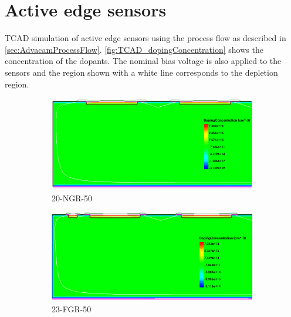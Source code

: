 \chapter{Active edge sensors}
\label{sec:appendixActiveEdge}

TCAD simulation of active edge sensors using the process flow as
described in
\cref{sec:AdvacamProcessFlow}. \cref{fig:TCAD_dopingConcentration}
shows the concentration of the dopants. The nominal bias voltage is
also applied to the sensors and the region shown with a white line
corresponds to the depletion region.

\begin{figure}[htbp]
  \centering
  \begin{subfigure}[b]{0.5\linewidth}
    \includegraphics[width=\textwidth]{figures/TCAD/dopingConcentration_NoGR.png}
    \caption{20-NGR-50}
  \end{subfigure}\hfill
  \begin{subfigure}[b]{0.5\linewidth}
    \includegraphics[width=\textwidth]{figures/TCAD/dopingConcentration_FloatGR.png}
    \caption{23-FGR-50}
  \end{subfigure} \\
  \begin{subfigure}[b]{0.5\linewidth}

\end{subfigure}
\end{figure}
